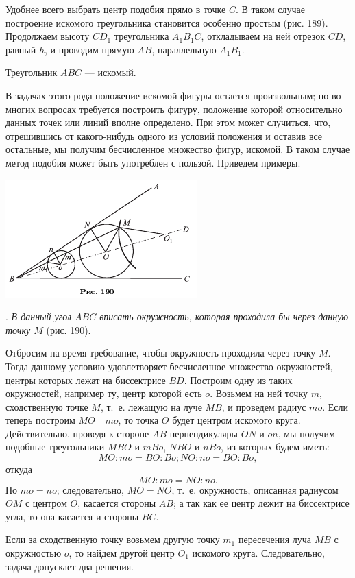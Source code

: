 \documentclass[oneside]{book}
\begin{document}
Удобнее всего выбрать центр подобия прямо в точке $C$.
В таком случае построение искомого треугольника становится особенно простым (рис. 189).
Продолжаем высоту $CD_1$ треугольника $A_1B_1C$, откладываем на ней отрезок $CD$, равный $h$, и проводим прямую $AB$, параллельную $A_1B_1$.

Треугольник $ABC$ — искомый.

В задачах этого рода положение искомой фигуры остается произвольным;
но во многих вопросах требуется построить фигуру, положение которой относительно данных точек или линий вполне определено.
При этом может случиться, что, отрешившись от какого-нибудь одного из условий положения и оставив все остальные, мы получим бесчисленное множество фигур,  искомой.
В таком случае метод подобия может быть употреблен с пользой.
Приведем примеры.

\includegraphics{pics/ris-190}

.
\emph{В данный угол $ABC$ вписать окружность, которая проходила бы через данную точку $M$} (рис. 190).

Отбросим на время требование, чтобы окружность проходила через точку $M$.
Тогда данному условию удовлетворяет бесчисленное множество окружностей, центры которых лежат на биссектрисе $BD$.
Построим одну из таких окружностей, например ту, центр которой есть $o$.
Возьмем на ней точку $m$, сходственную точке $M$, т.~е. лежащую на луче $MB$, и проведем радиус $mo$.
Если теперь построим $MO\parallel mo$, то точка $O$ будет центром искомого круга.
Действительно, проведя к стороне $AB$ перпендикуляры $ON$ и $on$, мы получим подобные треугольники $MBO$ и $mBo$, $NBO$ и $nBo$, из которых будем иметь:
\[MO:mo = BO:Bo; 
 NO:no = BO:Bo,
\]
откуда 
\[MO:mo = NO:no.\]
Но $mo =no$;
следовательно, $MO=NO$, т.~е. окружность, описанная радиусом $OM$ с центром $O$, касается стороны $AB$;
а так как ее центр лежит на биссектрисе угла, то она касается и стороны $BC$.

Если за сходственную точку возьмем другую точку $m_1$ пересечения луча $MB$ с окружностью $o$, то найдем другой центр $O_1$ искомого круга.
Следовательно, задача допускает два решения.
\end{document}

